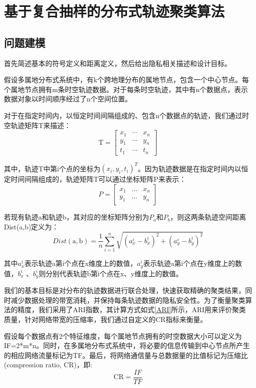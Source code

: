 \section{基于复合抽样的分布式轨迹聚类算法}

\subsection{问题建模}
首先简述基本的符号定义和距离定义，然后给出隐私相关描述和设计目标。

假设多属地分布式系统中，有k个跨地理分布的属地节点，包含一个中心节点。每个属地节点拥有m条时空轨迹数据。对于每条时空轨迹，其中有n个数据点，表示数据对象以时间顺序经过了n个空间位置。

对于在指定时间内，以恒定时间间隔组成的、包含n个数据点的轨迹，我们通过时空轨迹矩阵T来描述：
\[
\mathrm{T}=\left[\begin{array}{lll}
{x_{1}} & {\cdots} & {x_{n}} \\
{y_{1}} & {\cdots} & {y_{n}} \\
{t_{1}} & {\cdots} & {t_{n}}
\end{array}\right]
\]

其中，轨迹T中第i个点的坐标为$(x_i,y_i,t_i)^T$。因为轨迹数据是在指定时间内以恒定时间间隔组成的，轨迹矩阵T可以通过坐标矩阵P来表示：
\[
P=\left[\begin{array}{lll}
{x_{1}} & {\dots} & {x_{n}} \\
{y_{1}} & {\dots} & {y_{n}}
\end{array}\right]
\]

若现有轨迹a和轨迹b，其对应的坐标矩阵分别为$P_a$和$P_b$，则这两条轨迹空间距离Dist(a,b)定义为：
\begin{equation}
\label{ch3dist}
Dist(\mathrm{a}, \mathrm{b})=\frac{1}{n} \sum_{i=1}^{n} \sqrt{\left(a_{x}^{i}-b_{x}^{i}\right)^{2}+\left(a_{y}^{i}-b_{y}^{i}\right)^{2}}
\end{equation}

其中$a_x^i$表示轨迹a第i个点在x维度上的数值，$a_y^i$表示轨迹a第i个点在y维度上的数值，$b_x^i$ 、$b_y^i$则分别代表轨迹b第i个点在x、y维度上的数值。	

我们的基本目标是对分布的轨迹数据进行联合处理，快速获取精确的聚类结果，同时减少数据处理的带宽消耗，并保持每条轨迹数据的隐私安全性。为了衡量聚类算法的精度，我们采用了ARI指数，其计算方式如式\ref{ARI}所示，ARI用来评价聚类质量，针对网络带宽的压缩率，我们通过自定义的CR指标来衡量。

假设每个数据点有2个特征维度，每个属地节点拥有的时空数据大小可以定义为IF=2*m*n。同时，在多属地分布式系统中，将必要的信息传输到中心节点所产生的相应网络流量标记为TF。最后，将网络通信量与总数据量的比值标记为压缩比(compression ratio, CR)，即:
\begin{equation}
\label{CR}
\mathrm{CR}=\frac{I F}{T F}
\end{equation}

